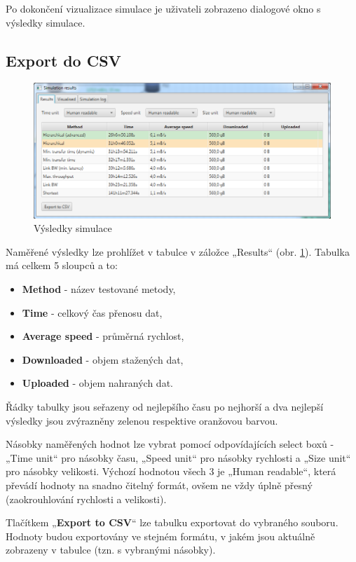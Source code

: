 \documentclass[czech,DP]{thesiskiv}
\begin{document}
Po dokončení vizualizace simulace je uživateli zobrazeno dialogové okno s výsledky simulace. 

\subsection{Export do CSV}

\begin{figure}
\centering
	\includegraphics[width=\textwidth]{img/prirucka/simulace_vysledky.png}
\caption{Výsledky simulace}
\label{fig:p_simulace_vysledky}
\end{figure}

Naměřené výsledky lze prohlížet v tabulce v záložce „Results“ (obr. \ref{fig:p_simulace_vysledky}). Tabulka má celkem 5 sloupců a to:

\begin{itemize}
\item \textbf{Method} - název testované metody,
\item \textbf{Time} - celkový čas přenosu dat,
\item \textbf{Average speed} - průměrná rychlost,
\item \textbf{Downloaded} - objem stažených dat,
\item \textbf{Uploaded} - objem nahraných dat.
\end{itemize}

\noindent Řádky tabulky jsou seřazeny od nejlepšího času po nejhorší a dva nejlepší výsledky jsou zvýrazněny zelenou respektive oranžovou barvou.

Násobky naměřených hodnot lze vybrat pomocí odpovídajících select boxů - „Time unit“ pro násobky času, „Speed unit“ pro násobky rychlosti a „Size unit“ pro násobky velikosti. Výchozí hodnotou všech 3 je „Human readable“, která převádí hodnoty na snadno čitelný formát, ovšem ne vždy úplně přesný (zaokrouhlování rychlosti a velikosti).

Tlačítkem „\textbf{Export to CSV}“ lze tabulku exportovat do vybraného souboru. Hodnoty budou exportovány ve stejném formátu, v jakém jsou aktuálně zobrazeny v tabulce (tzn. s vybranými násobky). 
\end{document}
